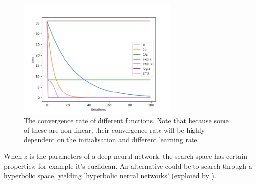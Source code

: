 \begin{figure}[h!]
\centering
\includegraphics[width=0.7\textwidth,height=0.35\textheight]{../../pictures/figures/reparam-mse-04.png}
\caption{The convergence rate of different functions. Note that because some of these are non-linear, their convergence rate will be highly dependent on the initialisation and different learning rate.}
\end{figure}

When $z$ is the parameters of a deep neural network, the search space has certain properties: for example it's euclidean.
An alternative could be to search through a hyperbolic space, yielding 'hyperbolic neural networks' (explored by \cite{Ganea2018}).
